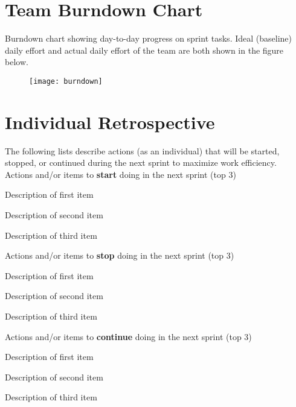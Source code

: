 \documentclass{article}
\begin{document}
\section{Team Burndown Chart}
Burndown chart showing day-to-day progress on sprint tasks. Ideal (baseline) daily effort and actual daily effort of the team are both shown in the figure below.
\begin{figure}[h]
\begin{center}
\texttt{[image: burndown]} %
\end{center}
\end{figure}

\pagebreak

\section{Individual Retrospective}
The following lists describe actions (as an individual) that will be started, stopped, or continued during the next sprint to maximize work efficiency. \\

Actions and/or items to \textbf{start} doing in the next sprint (top 3)
\begin{itemize}
\begin{item}
Description of first item
\end{item}
\begin{item}
Description of second item
\end{item}
\begin{item}
Description of third item
\end{item}
\end{itemize}

Actions and/or items to \textbf{stop} doing in the next sprint (top 3)
\begin{itemize}
\begin{item}
Description of first item
\end{item}
\begin{item}
Description of second item
\end{item}
\begin{item}
Description of third item
\end{item}
\end{itemize}

Actions and/or items to \textbf{continue} doing in the next sprint (top 3)
\begin{itemize}
\begin{item}
Description of first item
\end{item}
\begin{item}
Description of second item
\end{item}
\begin{item}
Description of third item
\end{item}
\end{itemize}
\end{document}
